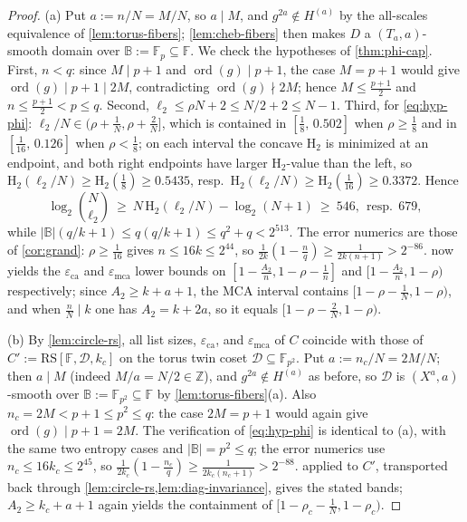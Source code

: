 \documentclass[11pt]{article}
\theoremstyle{definition}
\theoremstyle{remark}
\newcommand{\F}{\mathbb{F}}
\newcommand{\B}{\mathbb{B}}
\newcommand{\RS}{\mathrm{RS}}
\newcommand{\eca}{\varepsilon_{\mathrm{ca}}}
\newcommand{\emca}{\varepsilon_{\mathrm{mca}}}
\newcommand{\Hb}{\mathrm{H}_2}
\begin{document}
\begin{proof}
(a) Put $a:=n/N=M/N$, so $a\mid M$, and $g^{2a}\notin H^{(a)}$ by the all-scales equivalence of \cref{lem:torus-fibers}; \cref{lem:cheb-fibers} then makes $D$ a $(T_a,a)$-smooth domain over $\B:=\F_p\subseteq\F$. We check the hypotheses of \cref{thm:phi-cap}. First, $n<q$: since $M\mid p+1$ and $\operatorname{ord}(g)\mid p+1$, the case $M=p+1$ would give $\operatorname{ord}(g)\mid p+1\mid2M$, contradicting $\operatorname{ord}(g)\nmid2M$; hence $M\le\frac{p+1}2$ and $n\le\frac{p+1}2<p\le q$. Second, $\ell_2\le\rho N+2\le N/2+2\le N-1$. Third, for \eqref{eq:hyp-phi}: $\ell_2/N\in(\rho+\frac1N,\rho+\frac2N]$, which is contained in $[\frac18,\,0.502]$ when $\rho\ge\frac18$ and in $[\frac1{16},\,0.126]$ when $\rho<\frac18$; on each interval the concave $\Hb$ is minimized at an endpoint, and both right endpoints have larger $\Hb$-value than the left, so $\Hb(\ell_2/N)\ge\Hb(\frac18)\ge0.5435$, resp.\ $\Hb(\ell_2/N)\ge\Hb(\frac1{16})\ge0.3372$. Hence
\[
\log_2\binom N{\ell_2}\ \ge\ N\,\Hb(\ell_2/N)-\log_2(N+1)\ \ge\ 546,\ \ \text{resp.}\ \ 679,
\]
while $|\B|(q/k+1)\le q(q/k+1)\le q^2+q<2^{513}$. The error numerics are those of \cref{cor:grand}: $\rho\ge\frac1{16}$ gives $n\le16k\le2^{44}$, so $\frac1{2k}(1-\frac nq)\ge\frac1{2k(n+1)}>2^{-86}$.  now yields the $\eca$ and $\emca$ lower bounds on $[1-\frac{A_2}n,1-\rho-\frac1n]$ and $[1-\frac{A_2}n,1-\rho)$ respectively; since $A_2\ge k+a+1$, the MCA interval contains $[1-\rho-\frac1N,1-\rho)$, and when $\frac nN\mid k$ one has $A_2=k+2a$, so it equals $[1-\rho-\frac2N,1-\rho)$.

(b) By \cref{lem:circle-rs}, all list sizes, $\eca$, and $\emca$ of $C$ coincide with those of $C':=\RS[\F,\mathcal D,k_c]$ on the torus twin coset $\mathcal D\subseteq\F_{p^2}$. Put $a:=n_c/N=2M/N$; then $a\mid M$ (indeed $M/a=N/2\in\mathbb Z$), and $g^{2a}\notin H^{(a)}$ as before, so $\mathcal D$ is $(X^a,a)$-smooth over $\B:=\F_{p^2}\subseteq\F$ by \cref{lem:torus-fibers}(a). Also $n_c=2M<p+1\le p^2\le q$: the case $2M=p+1$ would again give $\operatorname{ord}(g)\mid p+1=2M$. The verification of \eqref{eq:hyp-phi} is identical to (a), with the same two entropy cases and $|\B|=p^2\le q$; the error numerics use $n_c\le16k_c\le2^{45}$, so $\frac1{2k_c}(1-\frac{n_c}q)\ge\frac1{2k_c(n_c+1)}>2^{-88}$.  applied to $C'$, transported back through \cref{lem:circle-rs,lem:diag-invariance}, gives the stated bands; $A_2\ge k_c+a+1$ again yields the containment of $[1-\rho_c-\frac1N,1-\rho_c)$.
\end{proof}
\end{document}
